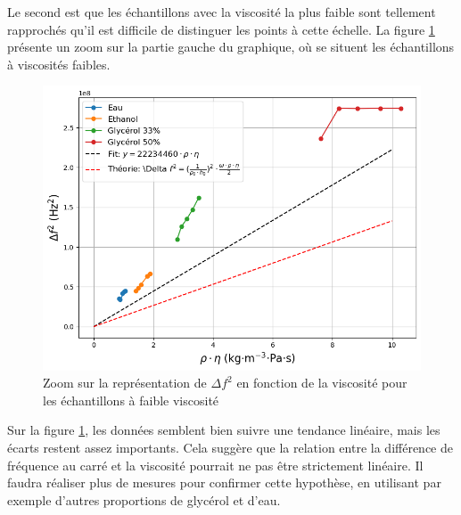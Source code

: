 Le second est que les échantillons avec la viscosité la plus faible sont tellement rapprochés qu’il est difficile de distinguer les points à cette échelle.  
La figure \ref{fig:Frequence carré VS Viscosité Zoom} présente un zoom sur la partie gauche du graphique, où se situent les échantillons à viscosités faibles.
\newpage
\begin{figure}[H]
    \centering
    \includegraphics[width=\textwidth]{assets/figures/FrequViscZoom.png}
    \caption{Zoom sur la représentation de $\Delta f^2$ en fonction de la viscosité pour les échantillons à faible viscosité}
    \label{fig:Frequence carré VS Viscosité Zoom}
\end{figure}

Sur la figure \ref{fig:Frequence carré VS Viscosité Zoom}, les données semblent bien suivre une tendance linéaire, mais les écarts restent assez importants.  
Cela suggère que la relation entre la différence de fréquence au carré et la viscosité pourrait ne pas être strictement linéaire.  
Il faudra réaliser plus de mesures pour confirmer cette hypothèse, en utilisant par exemple d’autres proportions de glycérol et d’eau.

